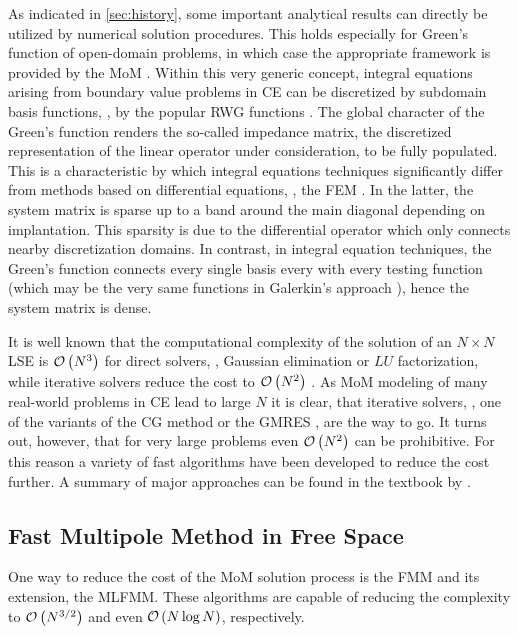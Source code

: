 As indicated in \cref{sec:history}, some important analytical results can
directly be utilized by numerical solution procedures.
This holds especially for Green's function of open-domain problems, in which
case the appropriate framework is provided by the \ac{MoM}
\cite{Harrington1993}.
Within this very generic concept, integral equations arising from boundary value
problems in \ac{CE} can be discretized by subdomain basis functions, \eg, by
the popular \ac{RWG} functions \cite{Rao1982}.
The global character of the Green's function renders the so-called impedance
matrix, \ie the discretized representation of the linear operator under
consideration, to be fully populated.
This is a characteristic by which integral equations techniques significantly
differ from methods based on differential equations, \eg, the \ac{FEM}
\cite{Jin2014}.
In the latter, the system matrix is sparse up to a band around the main diagonal
depending on implantation.
This sparsity is due to the differential operator which only connects nearby
discretization domains.
In contrast, in integral equation techniques, the Green's function connects 
every single basis every with every testing function (which may be the very
same functions in Galerkin's approach \cite{Harrington1993}), hence the 
system matrix is dense.

It is well known that the computational complexity of the solution of an
$N \times N$ \ac{LSE} is $\mathcal{O} \left( N^3 \right)$ for direct solvers,
\eg, Gaussian elimination or $LU$ factorization, while iterative solvers
reduce the cost to $\mathcal{O} \left( N^2 \right)$ \cite{Strang2010}.
As \ac{MoM} modeling of many real-world problems in \ac{CE} lead to large $N$
it is clear, that iterative solvers, \eg, one of the variants of the \ac{CG}
method or the \ac{GMRES} \cite{Strang2010}, are the way to go.
It turns out, however, that for very large problems even $\mathcal{O} \left( N^2 \right)$
can be prohibitive.
For this reason a variety of fast algorithms have been developed to reduce the
cost further.
A summary of major approaches can be found in the textbook by
\textcite[Chapter~11]{Jin2015}.







\subsection{Fast Multipole Method in Free Space}

One way to reduce the cost of the \ac{MoM} solution process is the \ac{FMM}
and its extension, the \ac{MLFMM}.
These algorithms are capable of reducing the complexity to $\mathcal{O} \left( N^{3/2} \right)$
and even $\mathcal{O} \left( N \log N \right)$, respectively.


